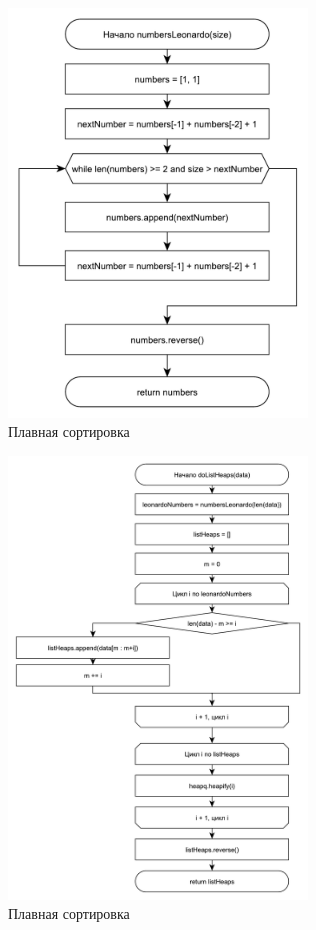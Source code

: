 \documentclass[12pt,a4paper]{scrartcl}
\begin{document}
\begin{figure}[h!]
	\centering
	\includegraphics[width=300px]{31.pdf}
	\caption{Плавная сортировка}
	\label{graph2.5}
\end{figure}

\begin{figure}[h!]
	\centering
	\includegraphics[width=300px]{32.pdf}
	\caption{Плавная сортировка}
	\label{graph2.6}
\end{figure}
\end{document}
